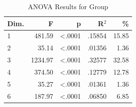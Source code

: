 \begin{table}[H]
  \centering
  \caption{ANOVA Results for Group}
  \label{tab:anova_group}
  \begin{tabular}{l r r r r}
    Dim. & F & p & R$^2$ & \% \\
    \hline
    1 & 481.59 & <.0001 & .15854 & 15.85 \\
    2 & 35.14 & <.0001 & .01356 & 1.36 \\
    3 & 1234.97 & <.0001 & .32577 & 32.58 \\
    4 & 374.50 & <.0001 & .12779 & 12.78 \\
    5 & 35.27 & <.0001 & .01361 & 1.36 \\
    6 & 187.97 & <.0001 & .06850 & 6.85 \\
  \end{tabular}
\end{table}
